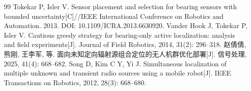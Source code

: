 \documentclass[UTF8,a4paper,zihao=-4,fontset=none]{ctexart}
\begin{document}
\setcounter{section}{7}

\FloatBarrier

\begin{thebibliography}{99}
 Tokekar P, Isler V. Sensor placement and selection for bearing sensors with bounded uncertainty[C]//IEEE International Conference on Robotics and Automation. 2013. DOI: 10.1109/ICRA.2013.6630920.
 Vander Hook J, Tokekar P, Isler V. Cautious greedy strategy for bearing-only active localization: analysis and field experiments[J]. Journal of Field Robotics, 2014, 31(2): 296--318.
 赵倩倩, 熊刚, 王李军, 等. 面向未知定向辐射源组合定位的无人机群优化部署[J]. 信号处理, 2025, 41(4): 668--682.
 Song D, Kim C Y, Yi J. Simultaneous localization of multiple unknown and transient radio sources using a mobile robot[J]. IEEE Transactions on Robotics, 2012, 28(3): 668--680.
\end{thebibliography}
\end{document}
